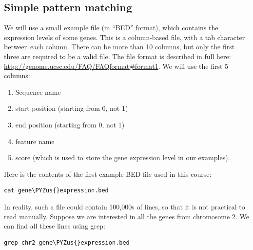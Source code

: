 \documentclass[11pt]{article}
\makeatletter
\providecommand{\tightlist}{%
      \setlength{\itemsep}{0pt}\setlength{\parskip}{0pt}}
\def\PYZus{\char`\_}
\newcommand{\boxspacing}{\kern\kvtcb@left@rule\kern\kvtcb@boxsep}
\newcommand{\prompt}[4]{
        {\ttfamily\llap{{\color{blue}\LARGE\faKeyboardO\hspace{3pt}#4}}\vspace{-\baselineskip}}
    }
\makeatother
\begin{document}
    \hypertarget{simple-pattern-matching}{%
\subsection{Simple pattern matching}\label{simple-pattern-matching}}

We will use a small example file (in ``BED'' format), which contains the
expression levels of some genes. This is a column-based file, with a tab
character between each column. There can be more than 10 columns, but
only the first three are required to be a valid file. The file format is
described in full here:
\url{http://genome.ucsc.edu/FAQ/FAQformat\#format1}. We will use the
first 5 columns:

\begin{enumerate}
\def\labelenumi{\arabic{enumi}.}
\tightlist
\item
  Sequence name
\item
  start position (starting from 0, not 1)
\item
  end position (starting from 0, not 1)
\item
  feature name
\item
  score (which is used to store the gene expression level in our
  examples).
\end{enumerate}

Here is the contents of the first example BED file used in this course:

    \begin{tcolorbox}[breakable, size=fbox, boxrule=1pt, pad at break*=1mm,colback=cellbackground, colframe=cellborder]
\prompt{In}{incolor}{ }{\boxspacing}
\begin{Verbatim}[commandchars=\\\{\}]
cat gene\PYZus{}expression.bed
\end{Verbatim}
\end{tcolorbox}

    In reality, such a file could contain 100,000s of lines, so that it is
not practical to read manually. Suppose we are interested in all the
genes from chromosome 2. We can find all these lines using grep:

    \begin{tcolorbox}[breakable, size=fbox, boxrule=1pt, pad at break*=1mm,colback=cellbackground, colframe=cellborder]
\prompt{In}{incolor}{ }{\boxspacing}
\begin{Verbatim}[commandchars=\\\{\}]
grep chr2 gene\PYZus{}expression.bed
\end{Verbatim}
\end{tcolorbox}
\end{document}
